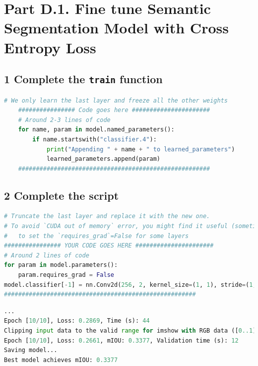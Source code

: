 \documentclass{article}
\begin{document}
\clearpage
\section*{Part D.1. Fine tune Semantic Segmentation Model with Cross Entropy Loss}



\subsection*{1 Complete the \texttt{train} function}

\begin{lstlisting}[language=Python]
    # We only learn the last layer and freeze all the other weights
    ################ Code goes here ######################
    # Around 2-3 lines of code
    for name, param in model.named_parameters():
        if name.startswith("classifier.4"):
            print("Appending " + name + " to learned_parameters")
            learned_parameters.append(param)
    ######################################################	
\end{lstlisting}



\subsection*{2 Complete the script}


\begin{lstlisting}[language=Python]
# Truncate the last layer and replace it with the new one.
# To avoid `CUDA out of memory` error, you might find it useful (sometimes required)
#   to set the `requires_grad`=False for some layers
################ YOUR CODE GOES HERE ######################
# Around 2 lines of code
for param in model.parameters():
    param.requires_grad = False
model.classifier[-1] = nn.Conv2d(256, 2, kernel_size=(1, 1), stride=(1, 1))
######################################################
\end{lstlisting}

\begin{lstlisting}[language=Python]
...
Epoch [10/10], Loss: 0.2869, Time (s): 44
Clipping input data to the valid range for imshow with RGB data ([0..1] for floats or [0..255] for integers).
Epoch [10/10], Loss: 0.2661, mIOU: 0.3377, Validation time (s): 12
Saving model...
Best model achieves mIOU: 0.3377


\end{lstlisting}
\end{document}
